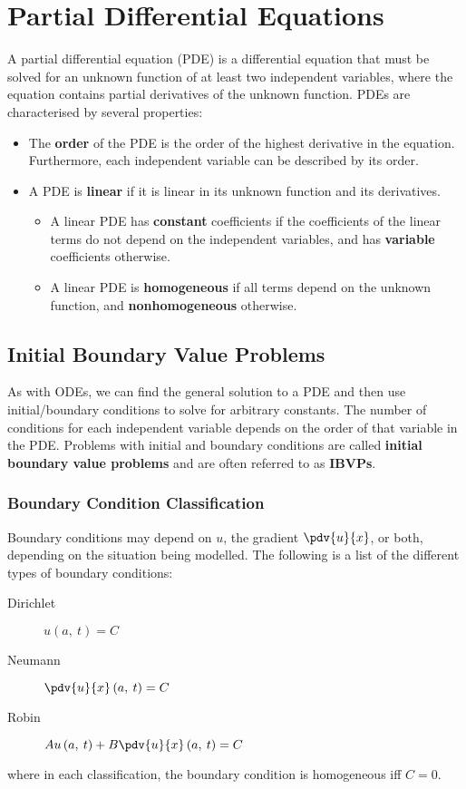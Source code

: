 \documentclass{article}
\begin{document}
\section{Partial Differential Equations}
A partial differential equation (PDE) is a differential equation that
must be solved for an unknown function of at least two independent
variables, where the equation contains partial derivatives of the
unknown function. PDEs are characterised by several properties:
\begin{itemize}
    \item The \textbf{order} of the PDE is the order of the highest
          derivative in the equation. Furthermore, each independent
          variable can be described by its order.
    \item A PDE is \textbf{linear} if it is linear in its unknown
          function and its derivatives.
          \begin{itemize}
              \item A linear PDE has \textbf{constant} coefficients if
                    the coefficients of the linear terms do not depend
                    on the independent variables, and has
                    \textbf{variable} coefficients otherwise.
              \item A linear PDE is \textbf{homogeneous} if all terms
                    depend on the unknown function, and
                    \textbf{nonhomogeneous} otherwise.
          \end{itemize}
\end{itemize}
\subsection{Initial Boundary Value Problems}
As with ODEs, we can find the general solution to a PDE and then use
initial/boundary conditions to solve for arbitrary constants. The
number of conditions for each independent variable depends on the order
of that variable in the PDE\@. Problems with initial and boundary
conditions are called \textbf{initial boundary value problems} and are
often referred to as \textbf{IBVPs}.
\subsubsection{Boundary Condition Classification}
Boundary conditions may depend on \(u\), the gradient \(\pdv{u}{x}\),
or both, depending on the situation being modelled. The following is a
list of the different types of boundary conditions:
\begin{description}
    \item[Dirichlet] \(u\left( a,\: t \right) = C\)
    \item[Neumann] \(\pdv{u}{x} \left( a,\: t \right) = C\)
    \item[Robin] \(A u\left( a,\: t \right) + B \pdv{u}{x} \left( a,\:
          t \right) = C\)
\end{description}
where in each classification, the boundary condition is homogeneous iff \(C = 0\).
\end{document}
